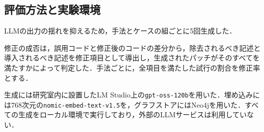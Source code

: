 \subsection{評価方法と実験環境}
LLMの出力の揺れを抑えるため，手法とケースの組ごとに5回生成した．

修正の成否は，誤用コードと修正後のコードの差分から，除去されるべき記述と導入されるべき記述を修正項目として導出し，生成されたパッチがそのすべてを満たすかによって判定した．手法ごとに，全項目を満たした試行の割合を修正率とする．

生成には研究室内に設置したLM Studio上の\texttt{gpt-oss-120b}を用いた．埋め込みには768次元の\texttt{nomic-embed-text-v1.5}を，グラフストアにはNeo4jを用いた．すべての生成をローカル環境で実行しており，外部のLLMサービスは利用していない．
